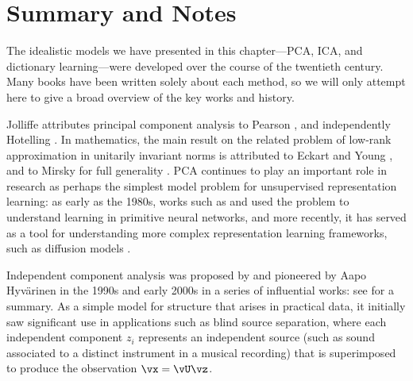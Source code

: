 \documentclass[../../book-main.tex]{subfiles}
\begin{document}
\section{Summary and Notes}

The idealistic models we have presented in this chapter---PCA, ICA, and
dictionary learning---were developed over the course of the twentieth century. 
Many books have been written solely about each method, so we will only attempt
here to give a broad overview of the key works and history.

Jolliffe \cite{Jolliffe1986} attributes principal component analysis to Pearson
\cite{Pearson1901}, and independently Hotelling \cite{Hotelling1933}. In
mathematics, the main result on the related problem of low-rank approximation in
unitarily invariant norms is attributed to Eckart and Young
\cite{Eckart1936-ep}, and to Mirsky for full generality \cite{Mirsky1960-ek}.
PCA continues to play an important role in research as perhaps the simplest
model problem for unsupervised representation learning: as early as the 1980s,
works such as \textcite{Oja1982SimplifiedNM} and \textcite{Baldi89} used the
problem to understand learning in primitive neural networks, and more recently,
it has served as a tool for understanding more complex representation learning
frameworks, such as diffusion models \cite{wang2024diffusion}.

Independent component analysis was proposed by \textcite{Ans-1985} and pioneered by
Aapo Hyv\"{a}rinen in the 1990s and early 2000s in a series of influential
works: see \textcite{Hyvrinen-2000} for a summary. As a simple model for
structure that arises in practical data, it initially saw significant use in
applications such as blind source separation, where each independent component
$z_i$ represents an independent source (such as sound associated to a distinct
instrument in a musical recording) that is superimposed to produce the
observation $\vx = \vU \vz$.
\end{document}
